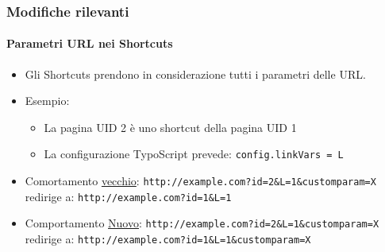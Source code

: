\begin{frame}[fragile]
	\frametitle{Modifiche rilevanti}
	\framesubtitle{Parametri URL nei Shortcuts}

	\begin{itemize}
		\item Gli Shortcuts prendono in considerazione tutti i parametri delle URL.
		\item Esempio:

			\begin{itemize}
				\item La pagina UID 2 è uno shortcut della pagina UID 1
				\item La configurazione TypoScript prevede: \texttt{config.linkVars = L}
			\end{itemize}

		\item Comortamento \underline{vecchio}:\newline
			\smaller
				\tabto{0.5cm}\texttt{http://example.com?id=2\&L=1\&customparam=X}\newline
				redirige a:\newline
				\tabto{0.5cm}\texttt{http://example.com?id=1\&L=1}
			\normalsize

		\item Comportamento \underline{Nuovo}:\newline
			\smaller
				\tabto{0.5cm}\texttt{http://example.com?id=2\&L=1\&customparam=X}\newline
				redirige a:\newline
				\tabto{0.5cm}\texttt{http://example.com?id=1\&L=1\&customparam=X}
			\normalsize

	\end{itemize}

\end{frame}


